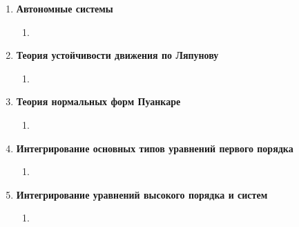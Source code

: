\documentclass[fleqn]{article}
\begin{document}
\begin{enumerate}[start = 1, label =\textbf{Глава \arabic*.}]
\begin{enumerate}[label=5.\arabic*.]
				\item 
			\end{enumerate}
		\item \textbf{Автономные системы}
			\begin{enumerate}[label=6.\arabic*.]
				\item 
			\end{enumerate}
		\item \textbf{Теория устойчивости движения по Ляпунову}
			\begin{enumerate}[label=7.\arabic*.]
				\item 
			\end{enumerate}
		\item \textbf{Теория нормальных форм Пуанкаре}
			\begin{enumerate}[label=8.\arabic*.]
				\item 
			\end{enumerate}
		\item \textbf{Интегрирование основных типов уравнений первого порядка}
			\begin{enumerate}[label=9.\arabic*.]
				\item 
			\end{enumerate}
		\item \textbf{Интегрирование уравнений высокого порядка и систем}
			\begin{enumerate}[label=10.\arabic*.]
				\item 
			\end{enumerate}
	\end{enumerate}
\end{document}
